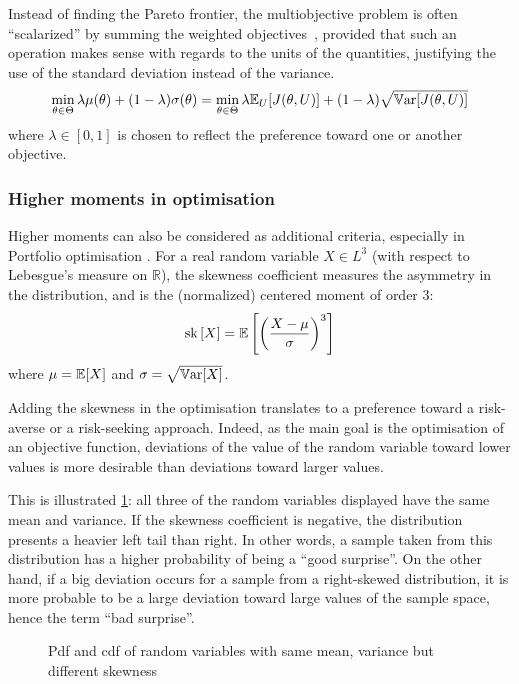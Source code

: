 \documentclass[../../Main_ManuscritThese.tex]{subfiles}
\newcommand\imgpath{/home/victor/acadwriting/Manuscrit/Text/Chapter3/img/}
\begin{document}
Instead of finding the Pareto frontier, the multiobjective problem is
often ``scalarized'' by summing the weighted
objectives~\citep{marler_weighted_2010}, provided that such an
operation makes sense with regards to the units of the quantities,
justifying the use of the standard deviation instead of the variance.
\begin{equation}
  \min_{\theta\in\Theta} \lambda \mu(\theta) + (1- \lambda)\sigma(\theta) =   \min_{\theta\in\Theta} \lambda \mathbb{E}_{U}[J(\theta,U)] + (1- \lambda)\sqrt{\mathbb{V}\mathrm{ar}[J(\theta,U)]}
\end{equation}
where $\lambda \in [0,1]$ is chosen to reflect the preference toward one or another objective.

\subsubsection{Higher moments in optimisation}
\label{sec:higher_moments}
Higher moments can also be considered as additional criteria,
especially in Portfolio optimisation
\citep{lai_mean-variance-skewness-kurtosis-based_2006,briec_mean-variance-skewness_2007}.
For a real random variable $X \in L^3$ (with respect to Lebesgue's
measure on $\mathbb{R}$), the skewness coefficient measures the
asymmetry in the distribution, and is the (normalized) centered moment
of order $3$:
\begin{equation}
  \mathrm{sk}\left[X\right] = \mathbb{E}\left[\left(\frac{X - \mu}{\sigma}\right)^3\right]
\end{equation}
where $\mu = \mathbb{E}[X]$ and $\sigma = \sqrt{\mathbb{V}\mathrm{ar}[X]}$.

Adding the skewness in the optimisation translates to a preference
toward a risk-averse or a risk-seeking approach. Indeed, as the main
goal is the optimisation of an objective function, deviations of the
value of the random variable toward lower values is more desirable
than deviations toward larger values.

This is illustrated \cref{fig:skewness_example}: all three of the
random variables displayed have the same mean and variance.  If the
skewness coefficient is negative, the distribution presents a heavier
left tail than right. In other words, a sample taken from this
distribution has a higher probability of being a ``good surprise''. On
the other hand, if a big deviation occurs for a sample from a
right-skewed distribution, it is more probable to be a large deviation
toward large values of the sample space, hence the term ``bad
surprise''.

\begin{figure}[ht]
  \centering
  
  \caption[Influence of the skewness]{\label{fig:skewness_example} Pdf and cdf of random variables with same mean, variance but different skewness}
\end{figure}
\end{document}
